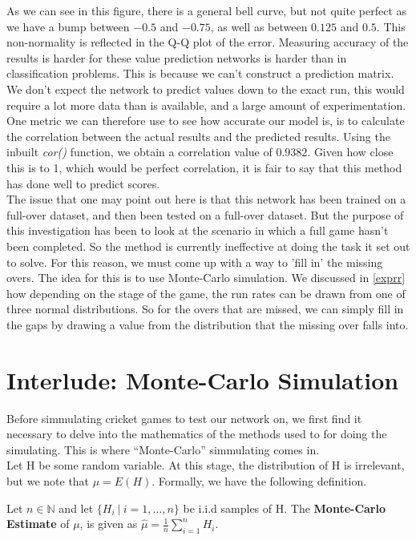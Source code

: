 As we can see in this figure, there is a general bell curve, but not quite perfect as we have a bump between $-0.5$ and $-0.75$, as well as between $0.125$ and $0.5$. This 
non-normality is reflected in the Q-Q plot of the error. Measuring accuracy of the results is harder for these value prediction networks is harder than in classification 
problems. This is because we can't construct a prediction matrix. We don't expect the network to predict values down to the exact run, this would require a lot more 
data than is available, and a large amount of experimentation. One metric we can therefore use to see how accurate our model is, is to calculate 
the correlation between the actual results and the predicted results. Using the inbuilt \textit{cor()} function, we obtain a correlation value of 
$0.9382$. Given how close this is to 1, which would be perfect correlation, it is fair to say that this method has done well to predict scores. \\

The issue that one may point out here is that this network has been trained on a full-over dataset, and then been tested on a full-over dataset. But the purpose of this 
investigation has been to look at the scenario in which a full game hasn't been completed. So the method is currently ineffective at doing the task it set out to solve. For this reason,
we must come up with a way to 'fill in' the missing overs. The idea for this is to use Monte-Carlo simulation. We discussed in \ref{exprr} how depending on the stage of the game,
the run rates can be drawn from one of three normal distributions. So for the overs that are missed, we can simply fill in the gaps by drawing a value from the distribution that the missing over falls 
into. 

\section{Interlude: Monte-Carlo Simulation}
\label{mcsim}
Before simmulating cricket games to test our network on, we first find it necessary to delve into the mathematics of the methods used to for doing the simulating. This is where
``Monte-Carlo'' simmulating comes in. \\
Let H be some random variable. At this stage, the distribution of H is irrelevant, but we note that $\mu = E(H)$. Formally, we have the following definition.

\begin{definition}
    Let $n \in \mathbb{N}$ and let $\{H_i \ | \ i =1,\ldots,n\}$ be i.i.d samples of H. The \textbf{Monte-Carlo Estimate} of $\mu$, is given as $\hat{\mu}=\frac{1}{n}\sum_{i=1}^n H_i$.  
\end{definition}

